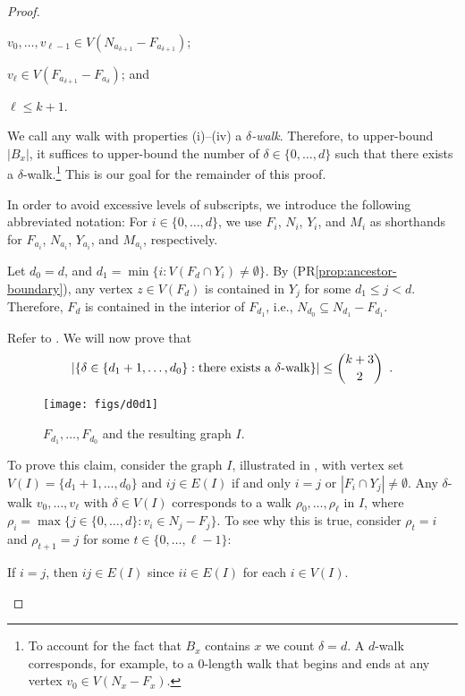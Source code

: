 \documentclass{patmorin}
\renewcommand{\propref}[1]{(PR\ref{prop:#1})}
\begin{document}
\begin{proof}
\begin{compactenum}[(i)]
    \item $v_0,\ldots,v_{\ell-1}\in V(N_{a_{\delta+1}}-F_{a_{\delta+1}})$;
    
    \item $v_\ell\in V(F_{a_{\delta+1}}-F_{a_\delta})$; and
    
    \item $\ell\le k+1$.
  \end{compactenum}
  We call any walk with properties (i)--(iv) a \emph{$\delta$-walk}. Therefore, to upper-bound $|B_x|$, it suffices to upper-bound the number of $\delta\in\{0,\ldots,d\}$ such that there exists a $\delta$-walk.\footnote{To account for the fact that $B_x$ contains $x$ we count $\delta=d$.  A $d$-walk corresponds, for example, to a 0-length walk that begins and ends at any vertex $v_0\in V(N_x-F_x)$.}  This is our goal for the remainder of this proof. 
  
  In order to avoid excessive levels of subscripts, we introduce the following abbreviated notation: For $i\in\{0,\ldots,d\}$, we use $F_i$, $N_i$, $Y_i$, and $M_i$ as shorthands for $F_{a_i}$, $N_{a_i}$, $Y_{a_i}$, and $M_{a_i}$, respectively.
  
  Let $d_0=d$, and $d_1=\min\{i: V(F_d\cap Y_i)\neq\emptyset \}$.  By \propref{ancestor-boundary}, any vertex $z\in V(F_d)$ is contained in 
  $Y_j$ for some $d_1\le j < d$.  Therefore, $F_d$ is contained in the interior of  $F_{d_1}$, i.e., $N_{d_0}\subseteq N_{d_1}-F_{d_1}$.   
  
  Refer to .  We will now prove that 
  \begin{equation}
     |\{\delta\in\{d_1+1,\ldots,d_0\}:  \mbox{there exists a $\delta$-walk} \}| \le \binom{k+3}{2} \enspace . \eqlabel{one-round}
  \end{equation}
  \begin{figure}
    \begin{center}
      \texttt{[image: figs/d0d1]}
    \end{center}
    \caption{$F_{d_1},\ldots,F_{d_0}$ and the resulting graph $I$.} 
  \end{figure}
  
  To prove this claim, consider the graph $I$, illustrated in , with vertex set $V(I)=\{d_1+1,\ldots,d_0\}$ and $ij\in E(I)$ if and only $i=j$ or $|F_i\cap Y_j|\neq\emptyset$.  Any $\delta$-walk $v_0,\ldots,v_\ell$ with $\delta\in V(I)$ corresponds to a walk $\rho_0,\ldots,\rho_{\ell}$ in $I$, where $\rho_i=\max\{j\in\{0,\ldots,d\} : v_i\in N_{j}-F_j\}$.  To see why this is true, consider $\rho_{t}= i$ and $\rho_{t+1}=j$ for some $t\in\{0,\ldots,\ell-1\}$:
  \begin{compactenum}
    \item If $i=j$, then $ij\in E(I)$ since $ii\in E(I)$ for each $i\in V(I)$.
    

\end{compactenum}
\end{proof}
\end{document}
